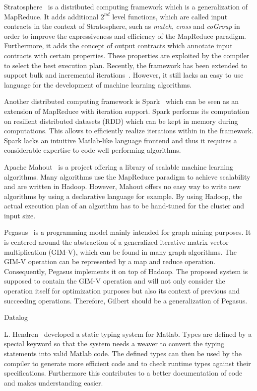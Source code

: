 \documentclass{dima}
\begin{document}
Stratosphere~\cite{battre:2010a} is a distributed computing framework which is a generalization of MapReduce.
It adds additional $2^{nd}$ level functions, which are called input contracts in the context of Stratosphere, such as \emph{match}, \emph{cross} and \emph{coGroup} in order to improve the expressiveness and efficiency of the MapReduce paradigm.
Furthermore, it adds the concept of output contracts which annotate input contracts with certain properties.
These properties are exploited by the compiler to select the best execution plan.
Recently, the framework has been extended to support bulk and incremental iterations~\cite{ewen:pve2012a}.
However, it still lacks an easy to use language for the development of machine learning algorithms.

Another distributed computing framework is Spark~\cite{zaharia:2010a} which can be seen as an extension of MapReduce with iteration support.
Spark performs its computation on resilient distributed datasets (RDD) which can be kept in memory during computations.
This allows to efficiently realize iterations within in the framework.
Spark lacks an intuitive Matlab-like language frontend and thus it requires a considerable expertise to code well performing algorithms.

Apache Mahout~\cite{apache:a2011} is a project offering a library of scalable machine learning algorithms.
Many algorithms use the MapReduce paradigm to achieve scalability and are written in Hadoop.
However, Mahout offers no easy way to write new algorithms by using a declarative language for example.
By using Hadoop, the actual execution plan of an algorithm has to be hand-tuned for the cluster and input size.

Pegasus~\cite{kang:2009a} is a programming model mainly intended for graph mining purposes.
It is centered around the abstraction of a generalized iterative matrix vector multiplication (GIM-V), which can be found in many graph algorithms.
The GIM-V operation can be represented by a map and reduce operation.
Consequently, Pegasus implements it on top of Hadoop.
The proposed system is supposed to contain the GIM-V operation and will not only consider the operation itself for optimization purposes but also its context of previous and succeeding operations.
Therefore, Gilbert should be a generalization of Pegasus.

Datalog~\cite{bu:apa2012a}

L. Hendren~\cite{hendren:2011a} developed a static typing system for Matlab.
Types are defined by a special keyword so that the system needs a weaver to convert the typing statements into valid Matlab code.
The defined types can then be used by the compiler to generate more efficient code and to check runtime types against their specifications.
Furthermore this contributes to a better documentation of code and makes understanding easier.
\end{document}
